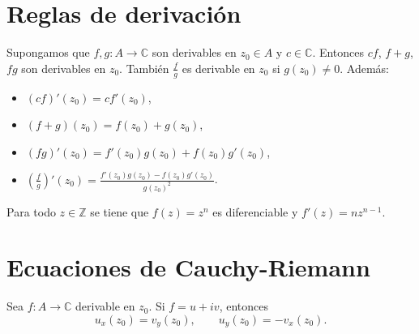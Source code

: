 \documentclass[spanish,presentation]{beamer}
\begin{document}
\section{Reglas de derivación}
\label{sec-2}

\begin{frame}[label=sec-2-1]{}
\begin{theorem}
Supongamos que \(f,g\colon A\to \mathbb{C}\) son derivables en
\(z_{0}\in A\) y \(c\in \mathbb{C}\). Entonces \(cf\), \(f+g\),
\(fg\) son derivables en \(z_{0}\). También \(\frac{f}{g}\) es
derivable en \(z_{0}\) si \(g(z_{0})\ne 0\). Además:

\begin{itemize}
\item \((cf)'(z_{0})=cf'(z_{0})\),
\item \((f+g)(z_{0})=f(z_{0})+g(z_{0})\),
\item \((fg)'(z_{0})=f'(z_{0})g(z_{0})+f(z_{0})g'(z_{0})\),
\item \((\frac{f}{g})'(z_{0})=\frac{f'(z_{0})g(z_{0})-f(z_{0})g'(z_{0})}{g(z_{0})^{2}}\).
\end{itemize}
\end{theorem}

\begin{theorem}
Para todo \(z\in \mathbb{Z}\) se tiene que \(f(z)=z^{n}\) es
diferenciable y \(f'(z)=nz^{n-1}\).
\end{theorem}
\end{frame}

\section{Ecuaciones de Cauchy-Riemann}
\label{sec-3}

\begin{frame}[label=sec-3-1]{}
\begin{theorem}
Sea \(f\colon A\to \mathbb{C}\) derivable en \(z_{0}\). Si
\(f=u+iv\), entonces
\begin{displaymath}
u_{x}(z_{0})=v_{y}(z_{0}),\qquad u_{y}(z_{0})=-v_{x}(z_{0}).
\end{displaymath}
\end{theorem}
\end{frame}
\end{document}
